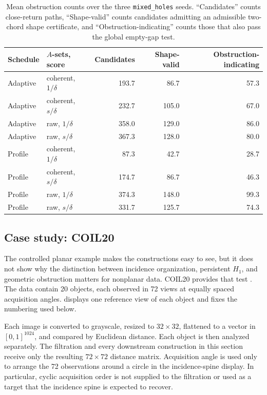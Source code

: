 \documentclass[a4paper,11pt]{article}
\theoremstyle{definition}
\theoremstyle{remark}
\begin{document}
\begin{table}[!ht]
\centering
\caption{Mean obstruction counts over the three \texttt{mixed\_holes} seeds. ``Candidates'' counts close-return paths, ``Shape-valid'' counts candidates admitting an admissible two-chord shape certificate, and ``Obstruction-indicating'' counts those that also pass the global empty-gap test.}
\label{tab:mixed-holes-obstruction}
\begin{tabular}{llrrr}
\toprule
Schedule & $A$-sets, score & Candidates & Shape-valid & Obstruction-indicating\\
\midrule
Adaptive & coherent, $1/\delta$ & 193.7 & 86.7 & 57.3\\
Adaptive & coherent, $s/\delta$ & 232.7 & 105.0 & 67.0\\
Adaptive & raw, $1/\delta$ & 358.0 & 129.0 & 86.0\\
Adaptive & raw, $s/\delta$ & 367.3 & 128.0 & 80.0\\
Profile & coherent, $1/\delta$ & 87.3 & 42.7 & 28.7\\
Profile & coherent, $s/\delta$ & 174.7 & 86.7 & 46.3\\
Profile & raw, $1/\delta$ & 374.3 & 148.0 & 99.3\\
Profile & raw, $s/\delta$ & 331.7 & 125.7 & 74.3\\
\bottomrule
\end{tabular}
\end{table}

\subsection{Case study: COIL20}
\label{subsec:coil20-incidence-obstruction}

The controlled planar example makes the constructions easy to see, but it does not show why the distinction between incidence organization, persistent $H_1$, and geometric obstruction matters for nonplanar data. COIL20 provides that test \cite{coil20}. The data contain 20 objects, each observed in 72 views at equally spaced acquisition angles.   displays one reference view of each object and fixes the numbering used below.

Each image is converted to grayscale, resized to $32\times32$, flattened to a vector in $[0,1]^{1024}$, and compared by Euclidean distance. Each object is then analyzed separately.  The filtration and every downstream construction in this section receive only the resulting $72\times72$ distance matrix. Acquisition angle is used only to arrange the 72 observations around a circle in the incidence-spine display. In particular, cyclic acquisition order is not supplied to the filtration or used as a target that the incidence spine is expected to recover.
\end{document}
